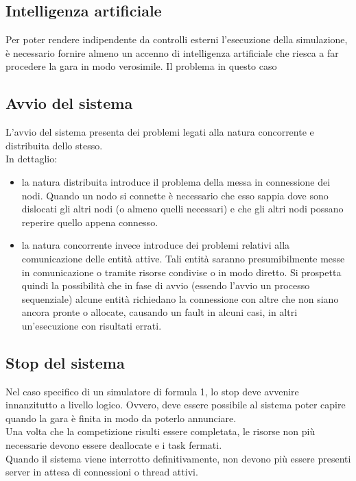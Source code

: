 \subsection{Intelligenza artificiale}
Per poter rendere indipendente da controlli esterni l'esecuzione della
simulazione, è necessario fornire almeno un accenno
di intelligenza artificiale che riesca a far procedere la gara in modo
verosimile. Il problema in questo caso
\subsection{Avvio del sistema}
\label{enunciazione_avvio}
L'avvio del sistema presenta dei problemi legati alla natura concorrente e
distribuita dello stesso.\\
In dettaglio:
\begin{itemize}
\item la natura distribuita introduce il problema della messa in connessione dei nodi. Quando un nodo si connette
è necessario che esso sappia dove sono dislocati gli altri nodi (o almeno quelli necessari) e che gli altri nodi
possano reperire quello appena connesso.
\item la natura concorrente invece introduce dei problemi relativi alla comunicazione delle entità attive. Tali entità
saranno presumibilmente messe in comunicazione o tramite risorse condivise o in modo diretto. Si prospetta quindi la
possibilità che in fase di avvio (essendo l'avvio un processo sequenziale) alcune entità richiedano la connessione con 
altre che non siano ancora pronte o allocate, causando un fault in alcuni casi, in altri un'esecuzione con risultati 
errati.
\end{itemize}
\subsection{Stop del sistema}
Nel caso specifico di un simulatore di formula 1, lo stop deve avvenire innanzitutto a livello logico. Ovvero, deve essere
possibile al sistema poter capire quando la gara è finita in modo da poterlo annunciare.\\
Una volta che la competizione risulti essere completata, le risorse non più necessarie devono essere deallocate e i task
fermati.\\
Quando il sistema viene interrotto definitivamente, non devono più essere
presenti server in attesa di connessioni o
thread attivi.